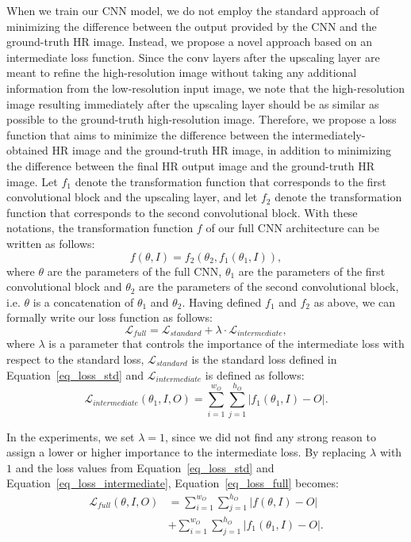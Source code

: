 \documentclass{ieeeaccess}
\begin{document}
When we train our CNN model, we do not employ the standard approach of minimizing the difference between the output provided by the CNN and the ground-truth HR image. Instead, we propose a novel approach based on an intermediate loss function. Since the conv layers after the upscaling layer are meant to refine the high-resolution image without taking any additional information from the low-resolution input image, we note that the high-resolution image resulting immediately after the upscaling layer should be as similar as possible to the ground-truth high-resolution image. Therefore, we propose a loss function that aims to minimize the difference between the intermediately-obtained HR image and the ground-truth HR image, in addition to minimizing the difference between the final HR output image and the ground-truth HR image. Let $f_1$ denote the transformation function that corresponds to the first convolutional block and the upscaling layer, and let $f_2$ denote the transformation function that corresponds to the second convolutional block. With these notations, the transformation function $f$ of our full CNN architecture can be written as follows:
\begin{equation}
f(\theta,I) = f_2(\theta_2, f_1(\theta_1, I)),
\end{equation}
where $\theta$ are the parameters of the full CNN, $\theta_1$ are the parameters of the first convolutional block and $\theta_2$ are the parameters of the second convolutional block, i.e. $\theta$ is a concatenation of $\theta_1$ and $\theta_2$. Having defined $f_1$ and $f_2$ as above, we can formally write our loss function as follows:
\begin{equation}\label{eq_loss_full}
\mathcal{L}_{full} = \mathcal{L}_{standard} + \lambda \cdot \mathcal{L}_{intermediate},
\end{equation}
where $\lambda$ is a parameter that controls the importance of the intermediate loss with respect to the standard loss, $\mathcal{L}_{standard}$ is the standard loss defined in Equation~\eqref{eq_loss_std} and $\mathcal{L}_{intermediate}$ is defined as follows:
\begin{equation}\label{eq_loss_intermediate}
\mathcal{L}_{intermediate}(\theta_1,I,O) = \sum_{i=1}^{w_O} \sum_{j=1}^{h_O} | f_1(\theta_1,I) - O |.
\end{equation}

In the experiments, we set $\lambda=1$, since we did not find any strong reason to assign a lower or higher importance to the intermediate loss. By replacing $\lambda$ with $1$ and the loss values from Equation~\eqref{eq_loss_std} and Equation~\eqref{eq_loss_intermediate}, Equation~\eqref{eq_loss_full} becomes:
\begin{equation}\label{eq_loss_full_explicit}
\begin{split}
\mathcal{L}_{full}(\theta,I,O) &= \sum_{i=1}^{w_O} \sum_{j=1}^{h_O} | f(\theta,I) - O | \\
&+  \sum_{i=1}^{w_O} \sum_{j=1}^{h_O} | f_1(\theta_1,I) - O |.
\end{split}
\end{equation}
\end{document}
